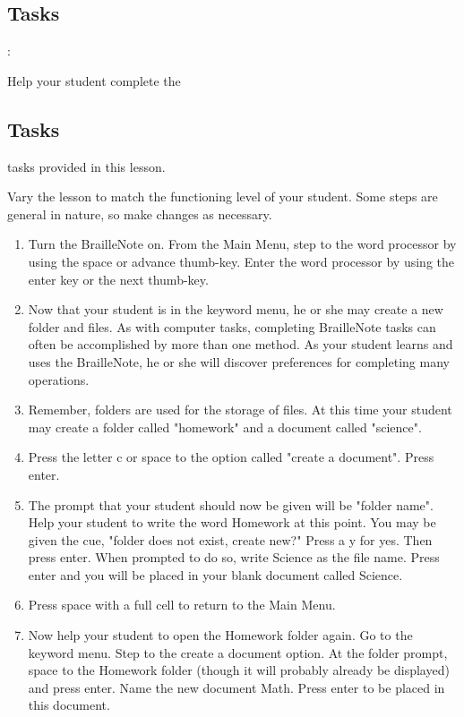 \documentclass[10pt,letterpaper,twoside]{report}
\begin{document}
{{{{ \subsection{Tasks}:



Help your student complete the  \subsection{Tasks} tasks provided in this lesson.

Vary the lesson to match the functioning level of your student.  Some steps are general in nature, so make changes as necessary.



\begin{enumerate}
	\item Turn the BrailleNote on. From the Main Menu, step to the word processor by using the space or advance thumb-key.  Enter the word processor by using the enter key or the next thumb-key.
	      
	\item Now that your student is in the keyword menu, he or she may create a new folder and files.  As with computer tasks, completing BrailleNote tasks can often be accomplished by more than one method.  As your student learns and uses the BrailleNote, he or she will discover preferences for completing many operations.
	      
	\item Remember, folders are used for the storage of files.  At this time your student may create a folder called "homework" and a document called "science".
	      
	\item Press the letter c or space to the option called "create a document". Press enter.
	      
	\item The prompt that your student should now be given will be "folder name". Help your student to write the word Homework at this point.  You may be given the cue, "folder does not exist, create new?" Press a y for yes.  Then press enter.  When prompted to do so, write Science as the file name. Press enter and you will be placed in your blank document called Science.
	      
	\item Press space with a full cell to return to the Main Menu.
	      
	\item Now help your student to open the Homework folder again.  Go to the keyword menu.  Step to the create a document option.  At the folder prompt, space to the Homework folder (though it will probably already be displayed) and press enter.  Name the new document Math. Press enter to be placed in this document.
	      

\end{enumerate}}}}}
\end{document}
